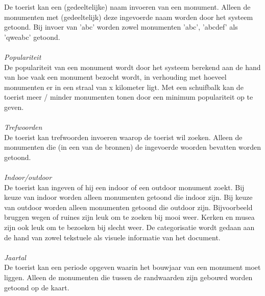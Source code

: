 \documentclass[a4paper,10pt]{article}
\begin{document}
			De toerist kan een (gedeeltelijke) naam invoeren van een monument. Alleen de monumenten met (gedeeltelijk) deze ingevoerde naam worden door het systeem getoond. Bij invoer van 'abc' worden zowel monumenten 'abc', 'abcdef' als 'qweabc' getoond.\\
			\\
			\textit{Populariteit}\\
			De populariteit van een monument wordt door het systeem berekend aan de hand van hoe vaak een monument bezocht wordt, in verhouding met hoeveel monumenten er in een straal van x kilometer ligt. Met een schuifbalk kan de toerist meer / minder monumenten tonen door een minimum populariteit op te geven.\\
			\\
			\textit{Trefwoorden}\\
			De toerist kan trefwoorden invoeren waarop de toerist wil zoeken. Alleen de monumenten die (in een van de bronnen) de ingevoerde woorden bevatten worden getoond.\\
			\\
			\textit{Indoor/outdoor}\\
			De toerist kan ingeven of hij een indoor of een outdoor monument zoekt. Bij keuze van indoor worden alleen monumenten getoond die indoor zijn. Bij keuze van outdoor worden alleen monumenten getoond die outdoor zijn. Bijvoorbeeld bruggen wegen of ruines zijn leuk om te zoeken bij mooi weer. Kerken en musea zijn ook leuk om te bezoeken bij slecht weer. De categorisatie wordt gedaan aan de hand van zowel tekstuele als visuele informatie van het document.\\
			\\
			\textit{Jaartal}\\
			De toerist kan een periode opgeven waarin het bouwjaar van een monument moet liggen. Alleen de monumenten die tussen de randwaarden zijn gebouwd worden getoond op de kaart.
\end{document}

